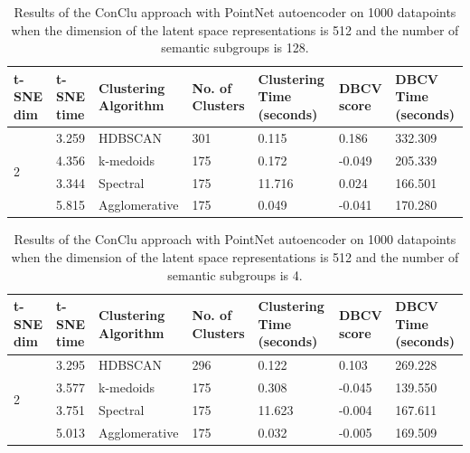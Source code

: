 \begin{table}[H]
  \setlength\extrarowheight{10pt}
  \caption{Results of the ConClu approach with PointNet autoencoder on 1000 datapoints when the dimension of the latent space representations is 512 and the number of semantic subgroups is 128. }
  \centering
  \begin{tabular}{|p{30pt}|p{50pt}|p{60pt}|p{50pt}|p{50pt}|p{50pt}|p{40pt}|}
    \toprule
    \ac{t-SNE} dim	& \ac{t-SNE} time & Clustering Algorithm & No. of Clusters & Clustering Time (seconds) & \ac{DBCV} score & \ac{DBCV} Time (seconds)\\
    \midrule
    \multirow{4}{30pt}{2}	& 3.259 & \ac{HDBSCAN}	& 301	& 0.115 & 0.186 	& 332.309 \\ \cline{2-7} 
    & 4.356 & k-medoids	& 175	& 0.172 & -0.049	& 205.339 \\ \cline{2-7} 
    & 3.344 & Spectral	& 175	& 11.716 & 0.024	& 166.501 \\ \cline{2-7}
    & 5.815 & Agglomerative	& 175	& 0.049 & -0.041	& 170.280 \\ 
    \bottomrule
  \end{tabular}
  \label{tab:conclu_k_128}
\end{table} 

\begin{table}[H]
  \setlength\extrarowheight{10pt}
  \caption{Results of the ConClu approach with PointNet autoencoder on 1000 datapoints when the dimension of the latent space representations is 512 and the number of semantic subgroups is 4. }
  \centering
  \begin{tabular}{|p{30pt}|p{50pt}|p{60pt}|p{50pt}|p{50pt}|p{50pt}|p{40pt}|}
    \toprule
    \ac{t-SNE} dim	& \ac{t-SNE} time & Clustering Algorithm & No. of Clusters & Clustering Time (seconds) & \ac{DBCV} score & \ac{DBCV} Time (seconds)\\
    \midrule
    \multirow{4}{30pt}{2}	& 3.295 & \ac{HDBSCAN}	& 296	& 0.122 & 0.103	& 269.228 \\ \cline{2-7} 
    & 3.577 & k-medoids	& 175	& 0.308 & -0.045	& 139.550 \\ \cline{2-7} 
    & 3.751 & Spectral	& 175	& 11.623 & -0.004	& 167.611 \\ \cline{2-7}
    & 5.013 & Agglomerative	& 175	& 0.032 & -0.005	& 169.509 \\ 
    \bottomrule
  \end{tabular}
  \label{tab:conclu_k_4}
\end{table} 

